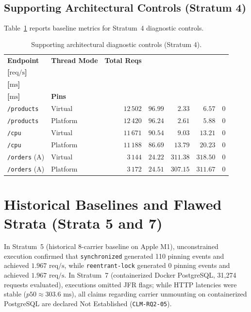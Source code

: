 

\subsection{Supporting Architectural Controls (Stratum 4)}
Table~\ref{tab:diagnostic-controls} reports baseline metrics for Stratum~4 diagnostic controls.

\begin{table}[htbp]
  \centering
  \small
  \setlength{\tabcolsep}{4pt}
  \caption{Supporting architectural diagnostic controls (Stratum 4).}
  \label{tab:diagnostic-controls}
  \begin{tabularx}{\textwidth}{@{}l >{\raggedright\arraybackslash}X r r r r c@{}}
    \toprule
    \textbf{Endpoint} & \textbf{Thread Mode} & \textbf{Total Reqs} & \shortstack{\textbf{Steady}\\\textbf{[$\text{req/s}$]}} & \shortstack{\textbf{$p50$}\\\textbf{[$\text{ms}$]}} & \shortstack{\textbf{$p95$}\\\textbf{[$\text{ms}$]}} & \textbf{Pins} \\
    \midrule
    \texttt{/products} & Virtual & $12\,502$ & $96.99$ & $2.33$ & $6.57$ & $0$ \\
    \texttt{/products} & Platform & $12\,420$ & $96.24$ & $2.61$ & $5.88$ & $0$ \\
    \texttt{/cpu} & Virtual & $11\,671$ & $90.54$ & $9.03$ & $13.21$ & $0$ \\
    \texttt{/cpu} & Platform & $11\,188$ & $86.69$ & $13.79$ & $20.23$ & $0$ \\
    \texttt{/orders} (A) & Virtual & $3\,144$ & $24.22$ & $311.38$ & $318.50$ & $0$ \\
    \texttt{/orders} (A) & Platform & $3\,172$ & $24.51$ & $307.15$ & $311.67$ & $0$ \\
    \bottomrule
  \end{tabularx}
\end{table}

\section{Historical Baselines and Flawed Strata (Strata 5 and 7)}
\label{sec:historical-flawed}

In Stratum~5 (historical 8-carrier baseline on Apple M1), unconstrained execution confirmed that \texttt{synchronized} generated 110 pinning events and achieved $1.967\text{ req/s}$, while \texttt{reentrant-lock} generated 0 pinning events and achieved $1.967\text{ req/s}$. In Stratum~7 (containerized Docker PostgreSQL, 31,274 requests evaluated), executions omitted JFR flags; while HTTP latencies were stable ($p50 \approx 303.6\text{ ms}$), all claims regarding carrier unmounting on containerized PostgreSQL are declared Not Established (\texttt{CLM-RQ2-05}).


